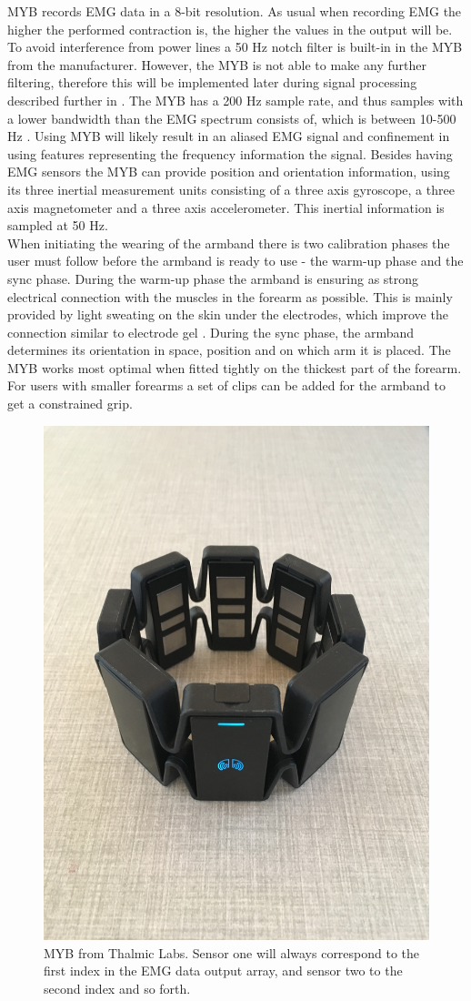 MYB records EMG data in a 8-bit resolution. As usual when recording EMG the higher the performed contraction is, the higher the values in the output will be. To avoid interference from power lines a 50 Hz notch filter is built-in in the MYB from the manufacturer. However, the MYB is not able to make any further filtering, therefore this will be implemented later during signal processing described further in . The MYB has a 200 Hz sample rate, and thus samples with a lower bandwidth than the EMG spectrum consists of, which is between 10-500 Hz \cite{Cram2012}. Using MYB will likely result in an aliased EMG signal and confinement in using features representing the frequency information the signal.
Besides having EMG sensors the MYB can provide position and orientation information, using its three inertial measurement units consisting of a three axis gyroscope, a three axis magnetometer and a three axis accelerometer. This inertial information is sampled at 50 Hz. \cite{Myoarmband2013} \\
When initiating the wearing of the armband there is two calibration phases the user must follow before the armband is ready to use - the warm-up phase and the sync phase. During the warm-up phase the armband is ensuring as strong electrical connection with the muscles in the forearm as possible. This is mainly provided by light sweating on the skin under the electrodes, which improve the connection similar to electrode gel \cite{Cram2012}. During the sync phase, the armband determines its orientation in space, position and on which arm it is placed. The MYB works most optimal when fitted tightly on the thickest part of the forearm. For users with smaller forearms a set of clips can be added for the armband to get a constrained grip. \cite{Myoarmband2013}

\begin{figure}[H]                 
	\includegraphics[width=.4\textwidth]{figures/xBackground/myoband}  
	\caption{MYB from Thalmic Labs. Sensor one will always correspond to the first index in the EMG data output array, and sensor two to the second index and so forth.}
	\label{fig:myoarmband} 
\end{figure}

